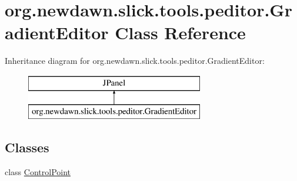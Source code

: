 \hypertarget{classorg_1_1newdawn_1_1slick_1_1tools_1_1peditor_1_1_gradient_editor}{}\section{org.\+newdawn.\+slick.\+tools.\+peditor.\+Gradient\+Editor Class Reference}
\label{classorg_1_1newdawn_1_1slick_1_1tools_1_1peditor_1_1_gradient_editor}
Inheritance diagram for org.\+newdawn.\+slick.\+tools.\+peditor.\+Gradient\+Editor\+:\begin{figure}[H]
\begin{center}
\leavevmode
\includegraphics[height=2.000000cm]{classorg_1_1newdawn_1_1slick_1_1tools_1_1peditor_1_1_gradient_editor}
\end{center}
\end{figure}
\subsection*{Classes}
\begin{DoxyCompactItemize}
\item 
class \mbox{\hyperlink{classorg_1_1newdawn_1_1slick_1_1tools_1_1peditor_1_1_gradient_editor_1_1_control_point}{Control\+Point}}
\end{DoxyCompactItemize}
